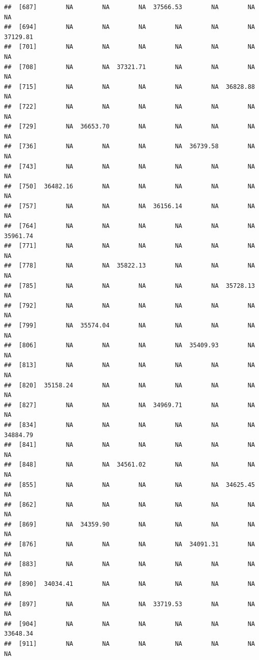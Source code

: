 \documentclass[
]{article}
\begin{document}
\begin{verbatim}
##  [687]        NA        NA        NA  37566.53        NA        NA        NA
##  [694]        NA        NA        NA        NA        NA        NA  37129.81
##  [701]        NA        NA        NA        NA        NA        NA        NA
##  [708]        NA        NA  37321.71        NA        NA        NA        NA
##  [715]        NA        NA        NA        NA        NA  36828.88        NA
##  [722]        NA        NA        NA        NA        NA        NA        NA
##  [729]        NA  36653.70        NA        NA        NA        NA        NA
##  [736]        NA        NA        NA        NA  36739.58        NA        NA
##  [743]        NA        NA        NA        NA        NA        NA        NA
##  [750]  36482.16        NA        NA        NA        NA        NA        NA
##  [757]        NA        NA        NA  36156.14        NA        NA        NA
##  [764]        NA        NA        NA        NA        NA        NA  35961.74
##  [771]        NA        NA        NA        NA        NA        NA        NA
##  [778]        NA        NA  35822.13        NA        NA        NA        NA
##  [785]        NA        NA        NA        NA        NA  35728.13        NA
##  [792]        NA        NA        NA        NA        NA        NA        NA
##  [799]        NA  35574.04        NA        NA        NA        NA        NA
##  [806]        NA        NA        NA        NA  35409.93        NA        NA
##  [813]        NA        NA        NA        NA        NA        NA        NA
##  [820]  35158.24        NA        NA        NA        NA        NA        NA
##  [827]        NA        NA        NA  34969.71        NA        NA        NA
##  [834]        NA        NA        NA        NA        NA        NA  34884.79
##  [841]        NA        NA        NA        NA        NA        NA        NA
##  [848]        NA        NA  34561.02        NA        NA        NA        NA
##  [855]        NA        NA        NA        NA        NA  34625.45        NA
##  [862]        NA        NA        NA        NA        NA        NA        NA
##  [869]        NA  34359.90        NA        NA        NA        NA        NA
##  [876]        NA        NA        NA        NA  34091.31        NA        NA
##  [883]        NA        NA        NA        NA        NA        NA        NA
##  [890]  34034.41        NA        NA        NA        NA        NA        NA
##  [897]        NA        NA        NA  33719.53        NA        NA        NA
##  [904]        NA        NA        NA        NA        NA        NA  33648.34
##  [911]        NA        NA        NA        NA        NA        NA        NA

\end{verbatim}
\end{document}
